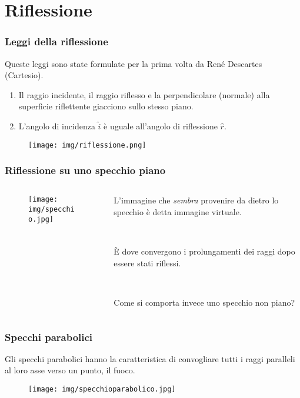 \documentclass[]{beamer}
\theoremstyle{plain}
\begin{document}
\section{Riflessione}

\begin{frame}
\frametitle{Leggi della riflessione}
Queste leggi sono state formulate per la prima volta da René Descartes (Cartesio).\pause
\begin{enumerate}
  \item Il raggio incidente, il raggio riflesso e la perpendicolare (normale) alla superficie riflettente giacciono sullo stesso piano.\pause
  \item L'angolo di incidenza $ \hat{i} $ è uguale all'angolo di riflessione $ \hat{r} $.
\end{enumerate}
\begin{figure}
\texttt{[image: img/riflessione.png]}
\end{figure}
\end{frame}


\begin{frame}
\frametitle{Riflessione su uno specchio piano}
\begin{columns}
\begin{column}{0.5\textwidth}
\begin{figure}
\texttt{[image: img/specchio.jpg]}
\end{figure}
\end{column}
\begin{column}{0.5\textwidth}
L'immagine che \emph<1>{sembra} provenire da dietro lo specchio è detta \alert<1>{immagine virtuale}.\pause

~

È dove convergono i \alert<2>{prolungamenti dei raggi} dopo essere stati riflessi.\pause

~

Come si comporta invece uno specchio non piano?
\end{column}
\end{columns}
\end{frame}


\begin{frame}
\frametitle{Specchi parabolici}
Gli specchi parabolici hanno la caratteristica di convogliare tutti i raggi paralleli al loro asse verso un punto, il \alert{fuoco}.
\begin{figure}
\texttt{[image: img/specchioparabolico.jpg]}
\end{figure}
\end{frame}
\end{document}
